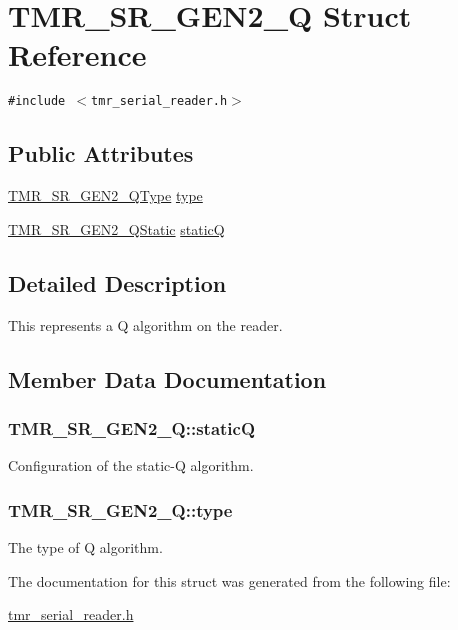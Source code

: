 \hypertarget{struct_t_m_r___s_r___g_e_n2___q}{
\section{TMR\_\-SR\_\-GEN2\_\-Q Struct Reference}
\label{struct_t_m_r___s_r___g_e_n2___q}
}
{\tt \#include $<$tmr\_\-serial\_\-reader.h$>$}

\subsection*{Public Attributes}
\begin{CompactItemize}
\item 
\hyperlink{tmr__serial__reader_8h_3bed220f21260999210ab0d66e8b9f69}{TMR\_\-SR\_\-GEN2\_\-QType} \hyperlink{struct_t_m_r___s_r___g_e_n2___q_9a1a788d3c9064812495ae5390b12c71}{type}
\item 
\hyperlink{struct_t_m_r___s_r___g_e_n2___q_static}{TMR\_\-SR\_\-GEN2\_\-QStatic} \hyperlink{struct_t_m_r___s_r___g_e_n2___q_d9d6f2d9cf34251f17eb800ee2b3ea37}{staticQ}
\end{CompactItemize}


\subsection{Detailed Description}
This represents a Q algorithm on the reader. 

\subsection{Member Data Documentation}
\hypertarget{struct_t_m_r___s_r___g_e_n2___q_d9d6f2d9cf34251f17eb800ee2b3ea37}{
\subsubsection[{staticQ}]{ {\bf TMR\_\-SR\_\-GEN2\_\-Q::staticQ}}}
\label{struct_t_m_r___s_r___g_e_n2___q_d9d6f2d9cf34251f17eb800ee2b3ea37}


Configuration of the static-Q algorithm. \hypertarget{struct_t_m_r___s_r___g_e_n2___q_9a1a788d3c9064812495ae5390b12c71}{
\subsubsection[{type}]{ {\bf TMR\_\-SR\_\-GEN2\_\-Q::type}}}
\label{struct_t_m_r___s_r___g_e_n2___q_9a1a788d3c9064812495ae5390b12c71}


The type of Q algorithm. 

The documentation for this struct was generated from the following file:\begin{CompactItemize}
\item 
\hyperlink{tmr__serial__reader_8h}{tmr\_\-serial\_\-reader.h}\end{CompactItemize}
